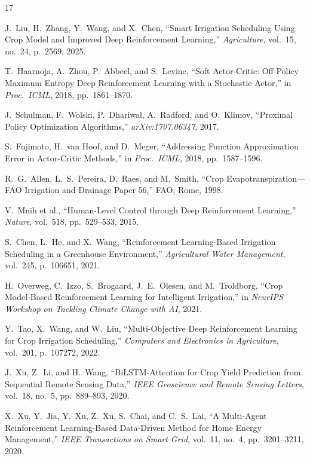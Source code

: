 \documentclass[12pt, a4paper]{article}
\begin{document}
\begin{thebibliography}{17}

J.~Liu, H.~Zhang, Y.~Wang, and X.~Chen, ``Smart Irrigation Scheduling Using Crop Model and Improved Deep Reinforcement Learning,'' \textit{Agriculture}, vol.~15, no.~24, p.~2569, 2025.

T.~Haarnoja, A.~Zhou, P.~Abbeel, and S.~Levine, ``Soft Actor-Critic: Off-Policy Maximum Entropy Deep Reinforcement Learning with a Stochastic Actor,'' in \textit{Proc.\ ICML}, 2018, pp.~1861--1870.

J.~Schulman, F.~Wolski, P.~Dhariwal, A.~Radford, and O.~Klimov, ``Proximal Policy Optimization Algorithms,'' \textit{arXiv:1707.06347}, 2017.

S.~Fujimoto, H.~van Hoof, and D.~Meger, ``Addressing Function Approximation Error in Actor-Critic Methods,'' in \textit{Proc.\ ICML}, 2018, pp.~1587--1596.

R.~G.~Allen, L.~S.~Pereira, D.~Raes, and M.~Smith, ``Crop Evapotranspiration---FAO Irrigation and Drainage Paper 56,'' FAO, Rome, 1998.

V.~Mnih et al., ``Human-Level Control through Deep Reinforcement Learning,'' \textit{Nature}, vol.~518, pp.~529--533, 2015.

S.~Chen, L.~He, and X.~Wang, ``Reinforcement Learning-Based Irrigation Scheduling in a Greenhouse Environment,'' \textit{Agricultural Water Management}, vol.~245, p.~106651, 2021.

H.~Overweg, C.~Izzo, S.~Brogaard, J.~E.~Olesen, and M.~Troldborg, ``Crop Model-Based Reinforcement Learning for Intelligent Irrigation,'' in \textit{NeurIPS Workshop on Tackling Climate Change with AI}, 2021.

Y.~Tao, X.~Wang, and W.~Liu, ``Multi-Objective Deep Reinforcement Learning for Crop Irrigation Scheduling,'' \textit{Computers and Electronics in Agriculture}, vol.~201, p.~107272, 2022.

J.~Xu, Z.~Li, and H.~Wang, ``BiLSTM-Attention for Crop Yield Prediction from Sequential Remote Sensing Data,'' \textit{IEEE Geoscience and Remote Sensing Letters}, vol.~18, no.~5, pp.~889--893, 2020.

X.~Xu, Y.~Jia, Y.~Xu, Z.~Xu, S.~Chai, and C.~S.~Lai, ``A Multi-Agent Reinforcement Learning-Based Data-Driven Method for Home Energy Management,'' \textit{IEEE Transactions on Smart Grid}, vol.~11, no.~4, pp.~3201--3211, 2020.


\end{thebibliography}
\end{document}
